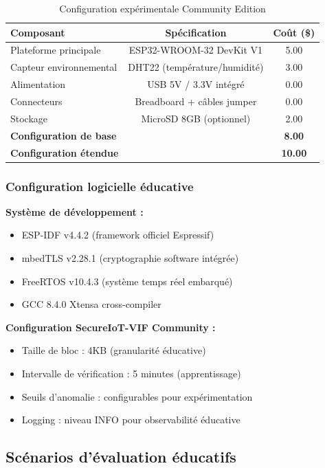 \begin{table}[h]
\centering
\caption{Configuration expérimentale Community Edition}
\label{tab:experimental-setup-community}
\begin{tabular}{|l|c|c|}
\hline
\textbf{Composant} & \textbf{Spécification} & \textbf{Coût (\$)} \\
\hline
Plateforme principale & ESP32-WROOM-32 DevKit V1 & 5.00 \\
Capteur environnemental & DHT22 (température/humidité) & 3.00 \\
Alimentation & USB 5V / 3.3V intégré & 0.00 \\
Connecteurs & Breadboard + câbles jumper & 0.00 \\
Stockage & MicroSD 8GB (optionnel) & 2.00 \\
\hline
\textbf{Configuration de base} & & \textbf{8.00} \\
\textbf{Configuration étendue} & & \textbf{10.00} \\
\hline
\end{tabular}
\end{table}

\subsubsection{Configuration logicielle éducative}

\textbf{Système de développement :}
\begin{itemize}
    \item ESP-IDF v4.4.2 (framework officiel Espressif)
    \item mbedTLS v2.28.1 (cryptographie software intégrée)
    \item FreeRTOS v10.4.3 (système temps réel embarqué)
    \item GCC 8.4.0 Xtensa cross-compiler
\end{itemize}

\textbf{Configuration SecureIoT-VIF Community :}
\begin{itemize}
    \item Taille de bloc : 4KB (granularité éducative)
    \item Intervalle de vérification : 5 minutes (apprentissage)
    \item Seuils d'anomalie : configurables pour expérimentation
    \item Logging : niveau INFO pour observabilité éducative
\end{itemize}

\subsection{Scénarios d'évaluation éducatifs}

